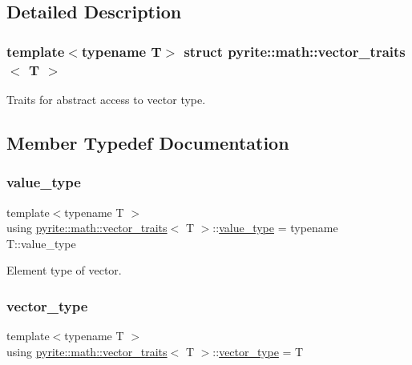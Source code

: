 \subsection{Detailed Description}
\subsubsection*{template$<$typename T$>$\newline
struct pyrite\+::math\+::vector\+\_\+traits$<$ T $>$}

Traits for abstract access to vector type. 

\subsection{Member Typedef Documentation}
\mbox{\label{structpyrite_1_1math_1_1vector__traits_a727892393454b3e72d96a1f3c15b37e2}} 
\subsubsection{\texorpdfstring{value\+\_\+type}{value\_type}}
{\footnotesize\ttfamily template$<$typename T $>$ \\
using \mbox{\hyperlink{structpyrite_1_1math_1_1vector__traits}{pyrite\+::math\+::vector\+\_\+traits}}$<$ T $>$\+::\mbox{\hyperlink{structpyrite_1_1math_1_1vector__traits_a727892393454b3e72d96a1f3c15b37e2}{value\+\_\+type}} =  typename T\+::value\+\_\+type}

Element type of vector. \mbox{\label{structpyrite_1_1math_1_1vector__traits_abae24d3748d9ac5db627b6288822400f}} 
\subsubsection{\texorpdfstring{vector\+\_\+type}{vector\_type}}
{\footnotesize\ttfamily template$<$typename T $>$ \\
using \mbox{\hyperlink{structpyrite_1_1math_1_1vector__traits}{pyrite\+::math\+::vector\+\_\+traits}}$<$ T $>$\+::\mbox{\hyperlink{structpyrite_1_1math_1_1vector__traits_abae24d3748d9ac5db627b6288822400f}{vector\+\_\+type}} =  T}

